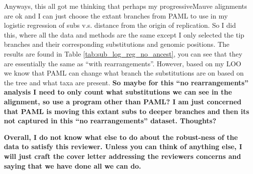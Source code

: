 \documentclass[12pt]{article}
\newcommand{\smel}{\textit{S.\,meliloti}\xspace}
\newcommand{\p}{progressiveMauve\xspace}
\newcommand{\strep}{\textit{Streptomyces}\xspace}
\newcommand{\bass}{\textit{B.\,subtilis}\xspace}
\newcommand{\ecol}{\textit{E.\,coli}\xspace}
\providecommand{\e}[1]{\ensuremath{\times 10^{#1}}}
\begin{document}
Anyways, this all got me thinking that perhaps my \p alignments are ok and I can just choose the extant branches from PAML to use in my logistic regression of subs v.s. distance from the origin of replication.
So I did this, where all the data and methods are the same except I only selected the tip branches and their corresponding substitutions and genomic positions.
The results are found in Table \ref{tab:sub_log_reg_no_ancest}, you can see that they are essentially the same as ``with rearrangements''.
However, based on my LOO we know that PAML can change what branch the substitutions are on based on the tree and what taxa are present.
\textbf{So maybe for this ``no rearrangements'' analysis I need to only count what substitutions we can see in the alignment, so use a program other than PAML? I am just concerned that PAML is moving this extant subs to deeper branches and then its not captured in this ``no rearrangements'' dataset. Thoughts?}

\textbf{Overall, I do not know what else to do about the robust-ness of the data to satisfy this reviewer. 
Unless you can think of anything else, I will just craft the cover letter addressing the reviewers concerns and saying that we have done all we can do.}

%
%		
\end{document}
